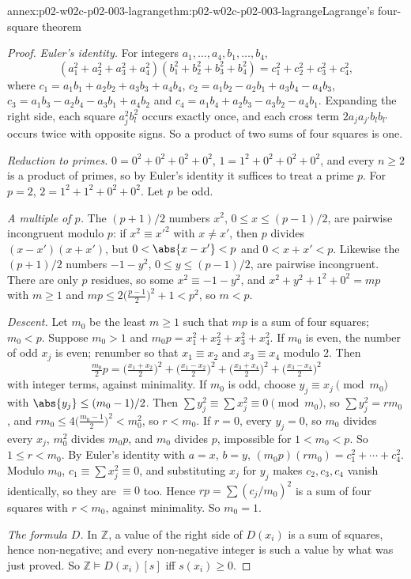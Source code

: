 \begin{annexitem}{annex:p02-w02c-p02-003-lagrange}{thm:p02-w02c-p02-003-lagrange}{Lagrange's four-square theorem}
\begin{proof}
\emph{Euler's identity.}  For integers \(a_1,\ldots,a_4,b_1,\ldots,b_4\),
\[
 (a_1^2+a_2^2+a_3^2+a_4^2)(b_1^2+b_2^2+b_3^2+b_4^2)=c_1^2+c_2^2+c_3^2+c_4^2,
\]
where \(c_1=a_1b_1+a_2b_2+a_3b_3+a_4b_4\),
\(c_2=a_1b_2-a_2b_1+a_3b_4-a_4b_3\),
\(c_3=a_1b_3-a_2b_4-a_3b_1+a_4b_2\) and
\(c_4=a_1b_4+a_2b_3-a_3b_2-a_4b_1\).  Expanding the right side, each
square \(a_j^2b_l^2\) occurs exactly once, and each cross term
\(2a_ja_{j'}b_lb_{l'}\) occurs twice with opposite signs.  So a product of
two sums of four squares is one.

\emph{Reduction to primes.}  \(0=0^2+0^2+0^2+0^2\),
\(1=1^2+0^2+0^2+0^2\), and every \(n\geq2\) is a product of primes, so by
Euler's identity it suffices to treat a prime \(p\).  For \(p=2\),
\(2=1^2+1^2+0^2+0^2\).  Let \(p\) be odd.

\emph{A multiple of \(p\).}  The \((p+1)/2\) numbers \(x^2\),
\(0\leq x\leq(p-1)/2\), are pairwise incongruent modulo \(p\): if
\(x^2\equiv x'^2\) with \(x\neq x'\), then \(p\) divides
\((x-x')(x+x')\), but \(0<\abs{x-x'}<p\) and \(0<x+x'<p\).  Likewise the
\((p+1)/2\) numbers \(-1-y^2\), \(0\leq y\leq(p-1)/2\), are pairwise
incongruent.  There are only \(p\) residues, so some \(x^2\equiv-1-y^2\),
and \(x^2+y^2+1^2+0^2=mp\) with \(m\geq1\) and
\(mp\leq2\bigl(\frac{p-1}2\bigr)^2+1<p^2\), so \(m<p\).

\emph{Descent.}  Let \(m_0\) be the least \(m\geq1\) such that \(mp\) is a
sum of four squares; \(m_0<p\).  Suppose \(m_0>1\) and
\(m_0p=x_1^2+x_2^2+x_3^2+x_4^2\).  If \(m_0\) is even, the number of odd
\(x_j\) is even; renumber so that \(x_1\equiv x_2\) and \(x_3\equiv x_4\)
modulo \(2\).  Then
\[
 \tfrac{m_0}2p=\bigl(\tfrac{x_1+x_2}2\bigr)^2+\bigl(\tfrac{x_1-x_2}2\bigr)^2
 +\bigl(\tfrac{x_3+x_4}2\bigr)^2+\bigl(\tfrac{x_3-x_4}2\bigr)^2
\]
with integer terms, against minimality.  If \(m_0\) is odd, choose
\(y_j\equiv x_j\pmod{m_0}\) with \(\abs{y_j}\leq(m_0-1)/2\).  Then
\(\sum y_j^2\equiv\sum x_j^2\equiv0\pmod{m_0}\), so \(\sum y_j^2=rm_0\),
and \(rm_0\leq4\bigl(\frac{m_0-1}2\bigr)^2<m_0^2\), so \(r<m_0\).  If
\(r=0\), every \(y_j=0\), so \(m_0\) divides every \(x_j\), \(m_0^2\)
divides \(m_0p\), and \(m_0\) divides \(p\), impossible for
\(1<m_0<p\).  So \(1\leq r<m_0\).  By Euler's identity with \(a=x\),
\(b=y\), \((m_0p)(rm_0)=c_1^2+\cdots+c_4^2\).  Modulo \(m_0\),
\(c_1\equiv\sum x_j^2\equiv0\), and substituting \(x_j\) for \(y_j\) makes
\(c_2,c_3,c_4\) vanish identically, so they are \(\equiv0\) too.  Hence
\(rp=\sum(c_j/m_0)^2\) is a sum of four squares with \(r<m_0\), against
minimality.  So \(m_0=1\).

\emph{The formula \(D\).}  In \(\mathbb Z\), a value of the right side of
\(D(x_i)\) is a sum of squares, hence non-negative; and every
non-negative integer is such a value by what was just proved.  So
\(\mathbb Z\models D(x_i)[s]\) iff \(s(x_i)\geq0\).
\end{proof}
\end{annexitem}

